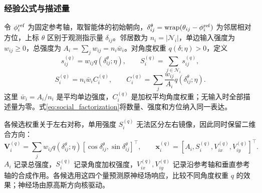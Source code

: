 \documentclass[UTF8,fontset=windows,11pt]{ctexart}
\begin{document}
\subsubsection{经验公式与描述量}
令 $\phi_i^{\rm ref}$ 为固定参考轴，取智能体的初始朝向，$\delta^\theta_{ij}=\operatorname{wrap}(\theta_{ij}-\phi_i^{\rm ref})$ 为邻居相对方位，上标 $\theta$ 区别于观测指示量 $\delta_{ij}$。邻居数为 $n_i=|\mathcal N_i|$，单边输入强度为 $w_{ij}\ge0$，总强度为 $A_i=\sum_jw_{ij}=n_i\bar w_i$。对角度权重 $q(\delta;\eta)>0$，定义
\begin{equation}
 s_{ij}^{(q)}=w_{ij}q(\delta^\theta_{ij};\eta),\qquad
 S_i^{(q)}=\sum_{j\in\mathcal N_i}s_{ij}^{(q)},
 \label{eq:total_social_input}
\end{equation}
\begin{equation}
 S_i^{(q)}=n_i\bar w_i C_i^{(q)},\qquad
 C_i^{(q)}=\sum_j\frac{w_{ij}}{A_i}q(\delta^\theta_{ij};\eta).
 \label{eq:social_factorization}
\end{equation}
这里 $\bar w_i=A_i/n_i$ 是平均单边强度，$C_i^{(q)}$ 是加权平均角度权重；无输入时全部描述量为零。式\eqref{eq:social_factorization}将数量、强度和方位纳入同一表达。

各候选权重关于左右对称，单用强度 $S_i^{(q)}$ 无法区分左右镜像，因此同时保留二维合方向：
\begin{equation}
 \boldsymbol V_i^{(q)}=\sum_jw_{ij}q(\delta^\theta_{ij};\eta)
 [\cos\delta^\theta_{ij},\sin\delta^\theta_{ij}]^\top,\qquad
 \boldsymbol x_i^{(q)}=[A_i,S_i^{(q)},V_{ix}^{(q)},V_{iy}^{(q)}]^\top.
 \label{eq:empirical_descriptor}
\end{equation}
$A_i$ 记录总强度，$S_i^{(q)}$ 记录角度加权强度，$V_{ix}^{(q)},V_{iy}^{(q)}$ 记录沿参考轴和垂直参考轴的合成作用。各候选用这四个量预测原神经场响应，比较不同角度权重 $q$ 的效果；神经场由原高斯方向核驱动。
\end{document}
